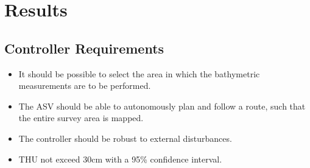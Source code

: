 \chapter{Results}\label{chap:results}

\section{Controller Requirements}
\begin{itemize}
    \item It should be possible to select the area in which the bathymetric measurements are to be performed.
    \item The ASV should be able to autonomously plan and follow a route, such that the entire survey area is mapped.
    \item The controller should be robust to external disturbances.
    \item THU not exceed 30cm with a 95\% confidence interval.
\end{itemize}

